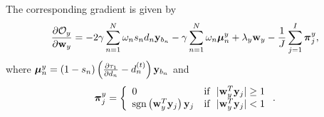
The corresponding gradient is given by
\begin{align}
\frac{\partial \mathcal{O}_{y}}{\partial {\bf w}_{y} }=-2\gamma\sum\limits_{n=1}^{N}\omega_{n}s_{n}d_{n}{\bf y}_{b_n}-\gamma\sum\limits_{n=1}^{N}\omega_{n}\mbox{\boldmath$\mu$\unboldmath}_{n}^{y}+\lambda_{y}{\bf w}_{y}- \frac{1}{J}\sum\limits_{j=1}^{I}
\mbox{\boldmath$\pi$\unboldmath}^{y}_{j},
\end{align}
where $\mbox{\boldmath$\mu$\unboldmath}_{n}^{y}=(1-s_{n}) \left(\frac{\partial \tau_1}{\partial d_{n}}-{d}^{(t)}_{n}\right){\bf y}_{b_n}$ and
\begin{align}
\mbox{\boldmath$\pi$\unboldmath}^{y}_{j}=\left\{ \begin{array}{ll}
    0 & \mbox{if ~}|{\bf w}_{y}^{T}{\bf y}_{j}| \ge 1 \\
    \mathop{\rm sgn}\left({\bf w}_{y}^{T}{\bf y}_{j}\right){\bf y}_{j}& \mbox{if ~} |{\bf w}_{y}^{T}{\bf y}_{j}|<1\nonumber
                                     \end{array} \right..
\end{align}


